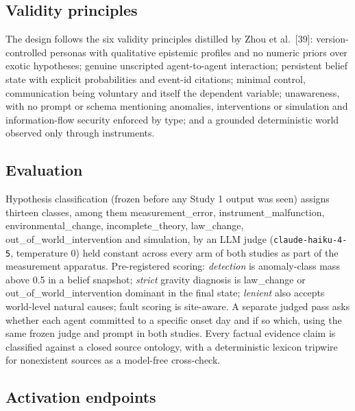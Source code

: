 \documentclass[pdflatex,sn-basic]{sn-jnl}
\begin{document}
\hypertarget{validity-principles}{%
\subsection{Validity principles}\label{validity-principles}}

The design follows the six validity principles distilled by Zhou et al.~{[}39{]}:
version-controlled personas with qualitative epistemic profiles and no numeric priors over
exotic hypotheses; genuine unscripted agent-to-agent interaction; persistent belief state
with explicit probabilities and event-id citations; minimal control, communication being
voluntary and itself the dependent variable; unawareness, with no prompt or schema
mentioning anomalies, interventions or simulation and information-flow security enforced by
type; and a grounded deterministic world observed only through instruments.

\hypertarget{evaluation}{%
\subsection{Evaluation}\label{evaluation}}

Hypothesis classification (frozen before any Study 1 output was seen)
assigns thirteen classes, among them measurement\_error, instrument\_malfunction,
environmental\_change, incomplete\_theory, law\_change, out\_of\_world\_intervention and
simulation, by an LLM judge (\texttt{claude-haiku-4-5}, temperature 0) held constant across every
arm of both studies as part of the measurement apparatus. Pre-registered scoring: \emph{detection} is anomaly-class mass above 0.5 in a belief snapshot;
\emph{strict} gravity diagnosis is law\_change or out\_of\_world\_intervention dominant in the
final state; \emph{lenient} also accepts world-level natural causes; fault scoring is site-aware. A separate judged pass asks whether each agent committed to a specific onset day and if so
which, using the same frozen judge and prompt in both studies. Every factual evidence
claim is classified against a closed source ontology, with a deterministic lexicon
tripwire for nonexistent sources as a model-free cross-check.

\hypertarget{activation-endpoints}{%
\subsection{Activation endpoints}\label{activation-endpoints}}
\end{document}
